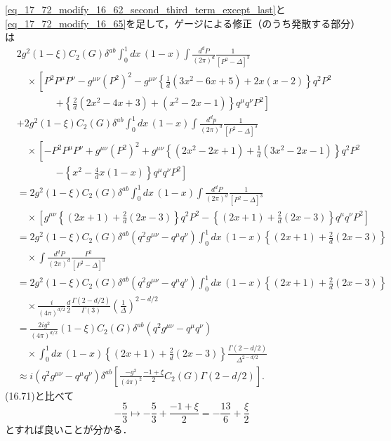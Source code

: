 \eqref{eq_17_72_modify_16_62_second_third_term_except_last}と\eqref{eq_17_72_modify_16_65}を足して，ゲージによる修正（のうち発散する部分）は
\begin{align*}
  & 2 g^2 (1-\xi) C_2(G) \delta^{ab} \int_0^1 dx \, (1-x) \int \frac{d^dP}{(2\pi)^d} \frac{1}{[P^2-\Delta]^3} \\
  &\quad \times \left[ P^2 P^\mu P^\nu - g^{\mu\nu} (P^2)^2 - g^{\mu\nu} \left\{ \frac{1}{d}(3x^2-6x+5) + 2x(x-2) \right\} q^2 P^2 \right. \\
  &\qquad\qquad \left. + \left\{ \frac{2}{d} (2x^2-4x+3) + (x^2-2x-1) \right\} q^\mu q^\nu P^2 \right] \\
  &+ 2 g^2 (1-\xi) C_2(G) \delta^{ab} \int_0^1 dx \, (1-x) \int \frac{d^dp}{(2\pi)^d} \frac{1}{[P^2-\Delta]^3} \\
  &\quad\times \left[ - P^2 P^\mu P^\nu + g^{\mu\nu} (P^2)^2 + g^{\mu\nu} \left\{ (2x^2-2x+1) + \frac{1}{d} (3x^2-2x-1) \right\} q^2 P^2 \right. \\
  &\qquad\qquad \left. - \left\{ x^2 - \frac{4}{d}x(1-x) \right\} q^\mu q^\nu P^2 \right] \\
  &= 2 g^2 (1-\xi) C_2(G) \delta^{ab} \int_0^1 dx \, (1-x) \int \frac{d^dP}{(2\pi)^d} \frac{1}{[P^2-\Delta]^3} \\
  &\quad\times \left[ g^{\mu\nu} \left\{ (2x+1) + \frac{2}{d} (2x-3) \right\} q^2 P^2
  - \left\{ (2x+1) + \frac{2}{d}(2x-3) \right\} q^\mu q^\nu P^2 \right] \\
  &= 2 g^2 (1-\xi) C_2(G) \delta^{ab} (q^2g^{\mu\nu} - q^\mu q^\nu) \int_0^1 dx \, (1-x)
  \left\{ (2x+1) + \frac{2}{d} (2x-3) \right\} \\
  &\quad\times \int \frac{d^dP}{(2\pi)^d} \frac{P^2}{[P^2-\Delta]^3} \\
  &= 2 g^2 (1-\xi) C_2(G) \delta^{ab} (q^2g^{\mu\nu} - q^\mu q^\nu) \int_0^1 dx \, (1-x)
  \left\{ (2x+1) + \frac{2}{d} (2x-3) \right\} \\
  &\quad\times \frac{i}{(4\pi)^{d/2}} \frac{d}{2} \frac{\Gamma(2-d/2)}{\Gamma(3)} \left( \frac{1}{\Delta} \right)^{2-d/2} \\
  &= \frac{2ig^2}{(4\pi)^{d/2}} (1-\xi) C_2(G) \delta^{ab} (q^2g^{\mu\nu} - q^\mu q^\nu) \\
  & \quad\times \int_0^1 dx \, (1-x) \left\{ (2x+1) + \frac{2}{d} (2x-3) \right\} \frac{\Gamma(2-d/2)}{\Delta^{2-d/2}} \\
  &\approx
  i (q^2g^{\mu\nu} - q^\mu q^\nu) \delta^{ab} \left[ \frac{-g^2}{(4\pi)^2} \frac{-1+\xi}{2} C_2(G)\Gamma(2-d/2) \right] .
\end{align*}
(16.71)と比べて
\[ - \frac{5}{3} \mapsto - \frac{5}{3} + \frac{-1+\xi}{2} = - \frac{13}{6} + \frac{\xi}{2} \]
とすれば良いことが分かる．


